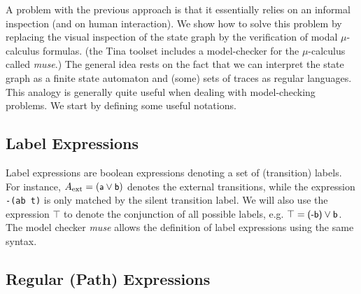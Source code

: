 \documentclass[a4paper]{scrartcl}
\def\vars#1{\textsf{\small #1}}
\newcommand{\ltl}[1]{\texttt{#1}}
\begin{document}
A problem with the previous approach is that it essentially relies on
an informal inspection (and on human interaction). We show how to
solve this problem by replacing the visual inspection of the state
graph by the verification of modal $\mu$-calculus formulas. (the Tina
toolset includes a model-checker for the $\mu$-calculus called
\emph{muse}.)  The general idea rests on the fact that we can
interpret the state graph as a finite state automaton and (some) sets
of traces as regular languages. This analogy is generally quite useful
when dealing with model-checking problems.  We start by defining some
useful notations.

\subsection{Label Expressions} 

Label expressions are boolean expressions denoting a set of
(transition) labels. For instance,
$A_\text{ext} = (\vars{a} \vee \vars{b})$ denotes the external
transitions, while the expression \ltl{-(\vars{a}\ltlor \vars{b}\ltlor
  \vars{t})} is only matched by the silent transition label. We will
also use the expression $\top$ to denote the conjunction of all
possible labels, e.g.
$\top = \text{\vars{(-b)}} \vee \text{\vars{b}}$. The model checker
\emph{muse} allows the definition of label expressions using the same
syntax.

\subsection{Regular (Path) Expressions} 
\end{document}
